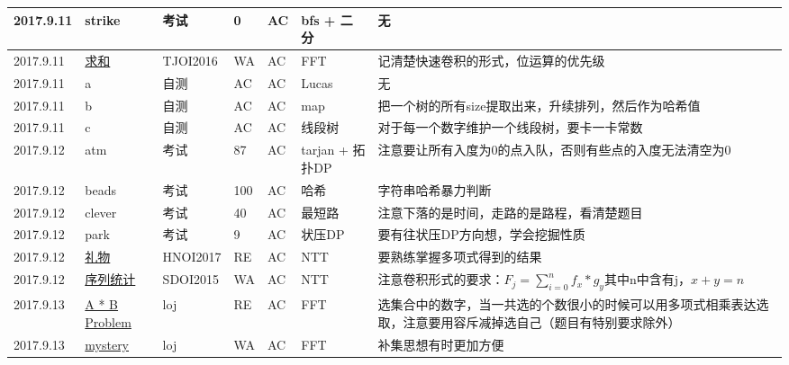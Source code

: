 \documentclass[a4paper]{article}
\begin{document}
\begin{longtable}{|p{1.5cm}|p{2.5cm}|p{1.6cm}|p{1.6cm}|p{1cm}|p{3cm}|p{4cm}|}
		\hline
		2017.9.11 & strike
		 & 考试 & 0 & AC & bfs + 二分 & 无\\
		
		\hline
		2017.9.11 & \href {http://www.lydsy.com/JudgeOnline/problem.php?id=4555}{求和}
		 & TJOI2016 & WA & AC & FFT & 记清楚快速卷积的形式，位运算的优先级\\
		
		\hline
		2017.9.11 & a
		 & 自测 & AC & AC & Lucas & 无\\
		
		\hline
		2017.9.11 & b
		 & 自测 & AC & AC & map & 把一个树的所有size提取出来，升续排列，然后作为哈希值\\
		
		\hline
		2017.9.11 & c
		 & 自测 & AC & AC & 线段树 & 对于每一个数字维护一个线段树，要卡一卡常数\\
		
		\hline
		2017.9.12 & atm
		 & 考试 & 87 & AC & tarjan + 拓扑DP & 注意要让所有入度为0的点入队，否则有些点的入度无法清空为0\\
		
		\hline
		2017.9.12 & beads
		 & 考试 & 100 & AC & 哈希 & 字符串哈希暴力判断\\
		
		\hline
		2017.9.12 & clever
		 & 考试 & 40 & AC & 最短路 & 注意下落的是时间，走路的是路程，看清楚题目\\
		
		\hline
		2017.9.12 & park
		 & 考试 & 9 & AC & 状压DP & 要有往状压DP方向想，学会挖掘性质\\
		
		\hline
		2017.9.12 & \href {http://www.lydsy.com/JudgeOnline/problem.php?id=4827}{礼物}
		 & HNOI2017 & RE & AC & NTT & 要熟练掌握多项式得到的结果\\
		
		\hline
		2017.9.12 & \href {http://www.lydsy.com/JudgeOnline/problem.php?id=3992}{序列统计}
		 & SDOI2015 & WA & AC & NTT & 注意卷积形式的要求：$F_j = \sum_{i=0}^nf_x*g_y$其中n中含有j，$x+y=n$\\
		
		\hline
		2017.9.13 & \href {https://loj.ac/problem/6156}{A * B Problem}
		 & loj & RE & AC & FFT & 选集合中的数字，当一共选的个数很小的时候可以用多项式相乘表达选取，注意要用容斥减掉选自己（题目有特别要求除外）\\
		
		\hline
		2017.9.13 & \href {https://loj.ac/problem/6228}{mystery}
		 & loj & WA & AC & FFT & 补集思想有时更加方便\\
		

\end{longtable}
\end{document}
